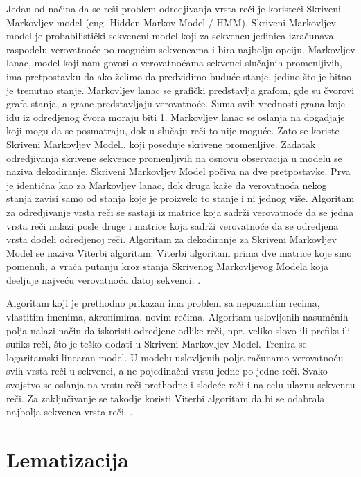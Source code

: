 \documentclass[12pt,oneside]{memoir}
\begin{document}
Jedan od načina da se reši problem odredjivanja vrsta reči je koristeći Skriveni Markovljev model (eng. Hidden Markov Model / HMM). Skriveni Markovljev model je probabilistički sekvencni model koji za sekvencu jedinica izračunava raspodelu verovatnoće po mogućim sekvencama i bira najbolju opciju.  Markovljev lanac,  model koji nam govori o verovatnoćama sekvenci slučajnih promenljivih,  ima pretpostavku da ako želimo da predvidimo buduće stanje,  jedino što je bitno je trenutno stanje.  Markovljev lanac se grafički predstavlja grafom, gde su čvorovi grafa stanja, a grane predstavljaju verovatnoće.  Suma svih vrednosti grana koje idu iz odredjenog čvora moraju biti 1.  Markovljev lanac se oslanja na dogadjaje koji mogu da se posmatraju,  dok u slučaju reči to nije moguće.  Zato se koriste Skriveni Markovljev Model., koji poseduje skrivene promenljive.  Zadatak odredjivanja skrivene sekvence promenljivih na osnovu observacija u modelu se naziva dekodiranje.  Skriveni Markovljev Model počiva na dve pretpostavke.  Prva je identična kao za Markovljev lanac, dok druga kaže da verovatnoća nekog stanja zavisi samo od stanja koje je proizvelo to stanje i ni jednog više.  Algoritam za odredjivanje vrsta reči se sastaji iz matrice koja sadrži verovatnoće da se jedna vrsta reči nalazi posle druge i matrice koja sadrži verovatnoće da se odredjena vrsta dodeli odredjenoj reči.  Algoritam za dekodiranje za Skriveni Markovljev Model se naziva Viterbi algoritam.  Viterbi algoritam prima dve matrice koje smo pomenuli, a vraća putanju kroz stanja Skrivenog Markovljevog Modela koja deeljuje najveću verovatnoću datoj sekvenci.  \cite{pos_tagging}.

Algoritam koji je prethodno prikazan ima problem sa nepoznatim recima,  vlastitim imenima,  akronimima,  novim rečima.  Algoritam uslovljenih nasumčnih polja nalazi način da iskoristi odredjene odlike reči,  npr. veliko slovo ili prefiks ili sufiks reči,  što je teško dodati u Skriveni Markovljev Model.  Trenira se logaritamski linearan model.  U modelu uslovljenih polja računamo verovatnoću svih vrsta reči u sekvenci,  a ne pojedinačni vrstu jedne po jedne reči.  Svako svojstvo se oslanja na vrstu reči prethodne i sledeće reči i na celu ulaznu sekvencu reči.  Za zaključivanje se takodje koristi Viterbi algoritam da bi se odabrala najbolja sekvenca vrsta reči.  \cite{pos_tagging}.

\section{Lematizacija}
\end{document}
